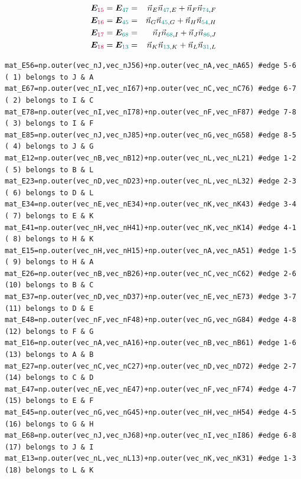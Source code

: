 \begin{enumerate}
\begin{eqnarray}
{\bm E}_{\color{purple}15} ={\bm E}_{\color{teal}47}   
&=&\vec{n}_E \vec{n}_{{\color{teal}47},E} 
+  \vec{n}_F \vec{n}_{{\color{teal}74},F} \nonumber\\
{\bm E}_{\color{purple}16} ={\bm E}_{\color{teal}45}   
&=&\vec{n}_G \vec{n}_{{\color{teal}45},G} 
+  \vec{n}_H \vec{n}_{{\color{teal}54},H} \nonumber\\
{\bm E}_{\color{purple}17} ={\bm E}_{\color{teal}68}   
&=&\vec{n}_I \vec{n}_{{\color{teal}68},I} 
+  \vec{n}_J \vec{n}_{{\color{teal}86},J} \nonumber\\
{\bm E}_{\color{purple}18} ={\bm E}_{\color{teal}13} 
&=&\vec{n}_K \vec{n}_{{\color{teal}13},K} 
+  \vec{n}_L \vec{n}_{{\color{teal}31},L} \nonumber
\end{eqnarray}

{\tiny
\begin{lstlisting}
mat_E56=np.outer(vec_nJ,vec_nJ56)+np.outer(vec_nA,vec_nA65) #edge 5-6 ( 1) belongs to J & A
mat_E67=np.outer(vec_nI,vec_nI67)+np.outer(vec_nC,vec_nC76) #edge 6-7 ( 2) belongs to I & C
mat_E78=np.outer(vec_nI,vec_nI78)+np.outer(vec_nF,vec_nF87) #edge 7-8 ( 3) belongs to I & F
mat_E85=np.outer(vec_nJ,vec_nJ85)+np.outer(vec_nG,vec_nG58) #edge 8-5 ( 4) belongs to J & G
mat_E12=np.outer(vec_nB,vec_nB12)+np.outer(vec_nL,vec_nL21) #edge 1-2 ( 5) belongs to B & L
mat_E23=np.outer(vec_nD,vec_nD23)+np.outer(vec_nL,vec_nL32) #edge 2-3 ( 6) belongs to D & L
mat_E34=np.outer(vec_nE,vec_nE34)+np.outer(vec_nK,vec_nK43) #edge 3-4 ( 7) belongs to E & K 
mat_E41=np.outer(vec_nH,vec_nH41)+np.outer(vec_nK,vec_nK14) #edge 4-1 ( 8) belongs to H & K
mat_E15=np.outer(vec_nH,vec_nH15)+np.outer(vec_nA,vec_nA51) #edge 1-5 ( 9) belongs to H & A
mat_E26=np.outer(vec_nB,vec_nB26)+np.outer(vec_nC,vec_nC62) #edge 2-6 (10) belongs to B & C
mat_E37=np.outer(vec_nD,vec_nD37)+np.outer(vec_nE,vec_nE73) #edge 3-7 (11) belongs to D & E
mat_E48=np.outer(vec_nF,vec_nF48)+np.outer(vec_nG,vec_nG84) #edge 4-8 (12) belongs to F & G
mat_E16=np.outer(vec_nA,vec_nA16)+np.outer(vec_nB,vec_nB61) #edge 1-6 (13) belongs to A & B
mat_E27=np.outer(vec_nC,vec_nC27)+np.outer(vec_nD,vec_nD72) #edge 2-7 (14) belongs to C & D
mat_E47=np.outer(vec_nE,vec_nE47)+np.outer(vec_nF,vec_nF74) #edge 4-7 (15) belongs to E & F
mat_E45=np.outer(vec_nG,vec_nG45)+np.outer(vec_nH,vec_nH54) #edge 4-5 (16) belongs to G & H
mat_E68=np.outer(vec_nJ,vec_nJ68)+np.outer(vec_nI,vec_nI86) #edge 6-8 (17) belongs to J & I
mat_E13=np.outer(vec_nL,vec_nL13)+np.outer(vec_nK,vec_nK31) #edge 1-3 (18) belongs to L & K
\end{lstlisting}
}



\end{enumerate}
